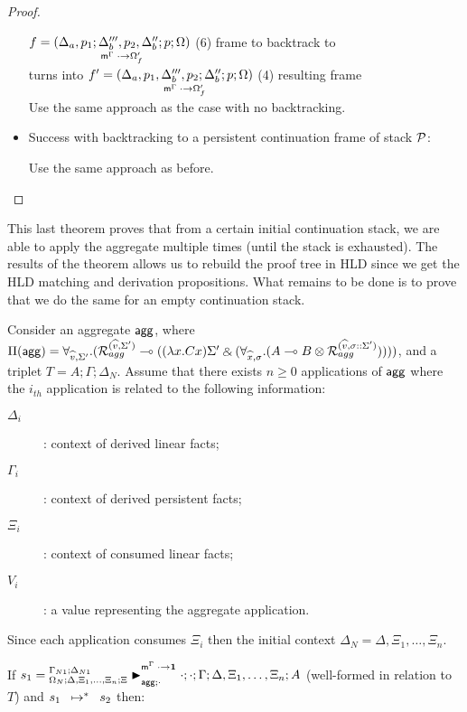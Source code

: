 \begin{proof}
\begin{itemize}[leftmargin=*]
      $f = \lframe{\Delta_a, p_1}{\Delta'''_b, p_2, \Delta''_b}{p}{\Omega}{\cdot}{\Omega'_f}$
      (6) frame to backtrack to \\
      turns into $f' = \lframe{\Delta_a, p_1, \Delta'''_b, p_2}{\Delta''_b}{p}{\Omega}{\cdot}{\Omega'_f}$
      \hfill (4) resulting frame \\

      Use the same approach as the case with no backtracking.
      
   \item Success with backtracking to a persistent continuation frame of stack
   $\lstack{P}$:

      Use the same approach as before.
      
\end{itemize}
\end{proof}

This last theorem proves that from a certain initial continuation stack, we are
able to apply the aggregate multiple times (until the stack is exhausted). The
results of the theorem allows us to rebuild the proof tree in HLD since we get
the HLD matching and derivation propositions. What remains to be done is to
prove that we do the same for an empty continuation stack.

\begin{lemma}\label{thm:aggregates}
Consider an aggregate $\m{agg}$, where $\Pi(\m{agg}) = \forall_{\widehat{v}, \Sigma'}.
   (\defstwo{agg}{\widehat{v}}{\Sigma'} \lolli ((\lambda x. C x)\Sigma' \with (\forall_{\widehat{x}, \sigma}.
                                                (A \lolli B \otimes
                                                 \defstwo{agg}{\widehat{v}}{\sigma
                                                 ::\Sigma'}))))$,
and a triplet $T = A; \Gamma; \Delta_{N}$.
Assume that there exists $n \geq 0$ applications of $\m{agg}$
where the $i_{th}$ application is related to the following information:
\begin{description}
   \item[$\Delta_i$]: context of derived linear facts;
   \item[$\Gamma_i$]: context of derived persistent facts;
   \item[$\Xi_i$]: context of consumed linear facts;
   \item[$V_i$]: a value representing the aggregate application.
\end{description}

Since each application consumes $\Xi_i$ then the initial context $\Delta_N =
\Delta, \Xi_1, \dotsc, \Xi_n$.

If $s_1 = \matstatea{\Delta, \Xi_1, \dotsc, \Xi_n}{\cdot;
   \cdot}{\Gamma}{\Delta, \Xi_1, \dotsc, \Xi_n}{A}{\cdot \rightarrow \one}{\cdot}$
   (well-formed in relation to $T$) and $\transs{s_1}{s_2}$ then:



\end{lemma}

